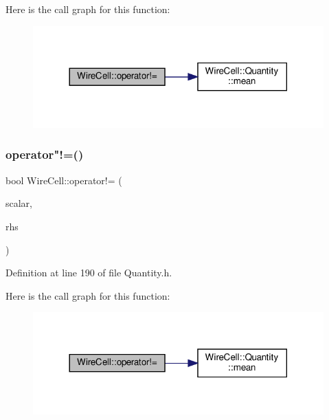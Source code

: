 Here is the call graph for this function\+:
\nopagebreak
\begin{figure}[H]
\begin{center}
\leavevmode
\includegraphics[width=317pt]{namespace_wire_cell_a01b41dc8ff8e255995b2f7614561f60c_cgraph}
\end{center}
\end{figure}
\mbox{\label{namespace_wire_cell_a4fb5edb30adbb46dbfcc72e2066c4268}} 
\subsubsection{\texorpdfstring{operator"!=()}{operator!=()}\hspace{0.1cm}{\footnotesize\ttfamily [3/3]}}
{\footnotesize\ttfamily bool Wire\+Cell\+::operator!= (\begin{DoxyParamCaption}\item[{const double \&}]{scalar,  }\item[{const \hyperlink{class_wire_cell_1_1_quantity}{Wire\+Cell\+::\+Quantity} \&}]{rhs }\end{DoxyParamCaption})\hspace{0.3cm}{\ttfamily [inline]}}



Definition at line 190 of file Quantity.\+h.

Here is the call graph for this function\+:
\nopagebreak
\begin{figure}[H]
\begin{center}
\leavevmode
\includegraphics[width=317pt]{namespace_wire_cell_a4fb5edb30adbb46dbfcc72e2066c4268_cgraph}
\end{center}
\end{figure}
\mbox{\label{namespace_wire_cell_a795a90cbc26590d08916714b56fdd8ec}} 
